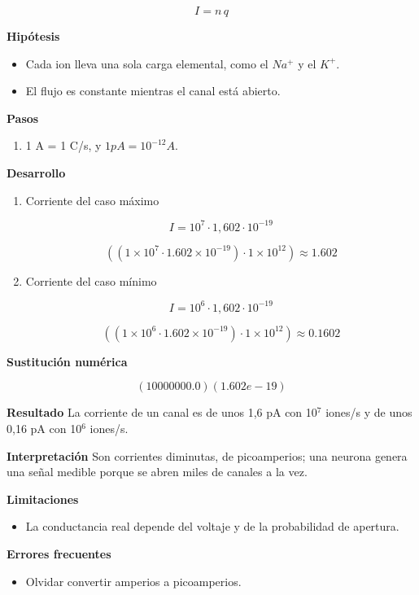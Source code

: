 \documentclass{book}
\begin{document}
\[
I = n\,q
\]

\noindent\textbf{Hipótesis}
\begin{itemize}
\item Cada ion lleva una sola carga elemental, como el \(Na^{+}\) y el \(K^{+}\).
\item El flujo es constante mientras el canal está abierto.
\end{itemize}

\noindent\textbf{Pasos}
\begin{enumerate}
\item
1 A = 1 C/s, y \(1 pA = 10^{-12} A\).

\end{enumerate}

\noindent\textbf{Desarrollo}
\begin{enumerate}
\item
Corriente del caso máximo


\[
I = 10^7 \cdot 1{,}602\cdot 10^{-19}
\]

\[
\left(\left(1\times 10^{7}\cdot 1.602\times 10^{-19}\right)\cdot 1\times 10^{12}\right) \approx 1.602
\]
\item
Corriente del caso mínimo


\[
I = 10^6 \cdot 1{,}602\cdot 10^{-19}
\]

\[
\left(\left(1\times 10^{6}\cdot 1.602\times 10^{-19}\right)\cdot 1\times 10^{12}\right) \approx 0.1602
\]
\end{enumerate}

\noindent\textbf{Sustitución numérica}

\[
\left(10000000.0\right) \left(1.602e-19\right)
\]

\noindent\textbf{Resultado}
La corriente de un canal es de unos 1,6 pA con 10\({}^{7}\) iones/s y de unos 0,16 pA con 10\({}^{6}\) iones/s.


\noindent\textbf{Interpretación}
Son corrientes diminutas, de picoamperios; una neurona genera una señal medible porque se abren miles de canales a la vez.


\noindent\textbf{Limitaciones}
\begin{itemize}
\item La conductancia real depende del voltaje y de la probabilidad de apertura.
\end{itemize}

\noindent\textbf{Errores frecuentes}
\begin{itemize}
\item Olvidar convertir amperios a picoamperios.
\end{itemize}
\end{document}
